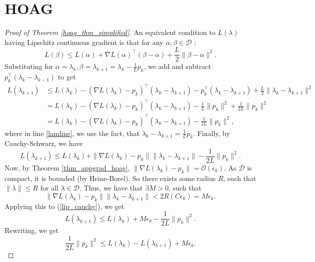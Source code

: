 \documentclass[11pt, twoside]{report}
\begin{document}
\section{HOAG}
\begin{proof}[Proof of Theorem \ref{hoag_thm_simplified}]
An equivalent condition to $L(\lambda)$ having Lipschitz continuous gradient is that for any $\alpha,\beta \in \mathcal{D}$ \cite{Zhou2018}:
\begin{equation} \label{lipschitz_equiv}
    L(\beta) \leq L(\alpha) + \nabla L(\alpha)^\top (\beta - \alpha) + \frac{L}{2}\|\beta - \alpha\|^2.
\end{equation}
Substituting for $\alpha = \lambda_k, \beta = \lambda_{k+1} = \lambda_k - \frac{1}{L}p_k$, we add and subtract $p_k^\top(\lambda_k - \lambda_{k-1})$ to get
\begin{align}
    L(\lambda_{k+1}) &\leq L(\lambda_k) - (\nabla L(\lambda_k) -p_k)^\top(\lambda_k - \lambda_{k+1}) -p_k^\top(\lambda_k - \lambda_{k+1})+\frac{L}{2}\|\lambda_k - \lambda_{k+1}\|^2 \\
    &= L(\lambda_k) - (\nabla L(\lambda_k) -p_k)^\top(\lambda_k - \lambda_{k+1}) -\frac{1}{L}\|p_k\|^2+\frac{1}{2L}\|p_k\|^2 \quad  \label{lamline} \\
    &=L(\lambda_k) - (\nabla L(\lambda_k) -p_k)^\top(\lambda_k - \lambda_{k+1}) -\frac{1}{2L}\|p_k\|^2,
\end{align}
where in line \ref{lamline}, we use the fact, that $\lambda_{k}-\lambda_{k+1} = \frac{1}{L}p_k$. Finally, by Cauchy-Schwarz, we have
\begin{equation} \label{lip_cauchy}
    L(\lambda_{k+1}) \leq L(\lambda_k) + \|\nabla L(\lambda_k) -p_k\|\|\lambda_k - \lambda_{k+1}\| -\frac{1}{2L}\|p_k\|^2.
\end{equation}
Now, by Theorem \ref{thm_appgrad_hoag}, $\|\nabla L(\lambda_k) -p_k\| = \mathcal{O}(\epsilon_k)$. As $\mathcal{D}$ is compact, it is bounded (by Heine-Borel). So there exists some radius $R$, such that $\|\lambda\| \leq R$ for all $\lambda \in \mathcal{D}$. Thus, we have that $\exists M>0$, such that
\[\|\nabla L(\lambda_k) -p_k\|\|\lambda_k - \lambda_{k+1}\| < 2R(C \epsilon_k) = M\epsilon_k.\]
Applying this to (\ref{lip_cauchy}), we get
\begin{equation} \label{lip_cauchy_2}
    L(\lambda_{k+1}) \leq L(\lambda_k) + M\epsilon_k -\frac{1}{2L}\|p_k\|^2.
\end{equation}
Rewriting, we get
\begin{equation} \label{lam_bound}
    \frac{1}{2L}\|p_k\|^2 \leq L(\lambda_k) - L(\lambda_{k+1}) + M\epsilon_k.

\end{equation}
\end{proof}
\end{document}
